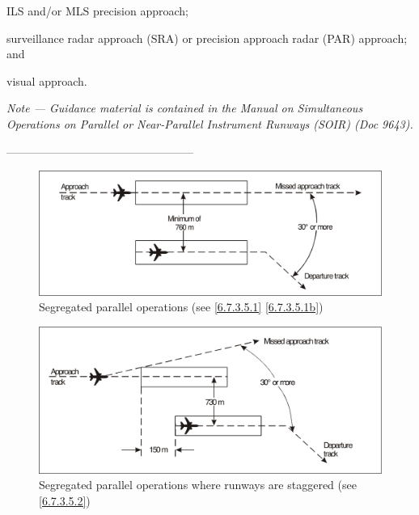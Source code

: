 \documentclass[../main.tex]{subfiles}
\begin{document}
\begin{enumerate}[itemsep=0.2cm]
\begin{enumerate}
            \begin{enumalph}
                \item ILS and/or MLS precision approach;
                \item surveillance radar approach (SRA) or precision approach radar (PAR) approach; and
                \item visual approach.
            \end{enumalph}

            \textit{Note --- Guidance material is contained in the \emph{Manual on Simultaneous Operations on Parallel or Near-Parallel Instrument Runways (SOIR)} (Doc 9643).}
        \end{enumerate}
    \end{enumerate}

    \begin{center}
        \vfill
        --------------------------------------------------
        \newpage
    \end{center}

    \begin{figure}[!ht]
        \centering
        \includegraphics[width=14cm]{Images/Fig 6-1.png}
        \caption[Segregated parallel operations]{Segregated parallel operations (see \ref{6.7.3.5.1} \ref{6.7.3.5.1b})}
        \label{fig:6-1}
    \end{figure}

    \vfill
    \begin{figure}[!ht]
        \centering
        \includegraphics[width=14cm]{Images/Fig 6-2.png}
        \caption[Segregated parallel operations where runways are staggered]{Segregated parallel operations where runways are staggered (see \ref{6.7.3.5.2})}
        \label{fig:6-2}
    \end{figure}
\end{document}
